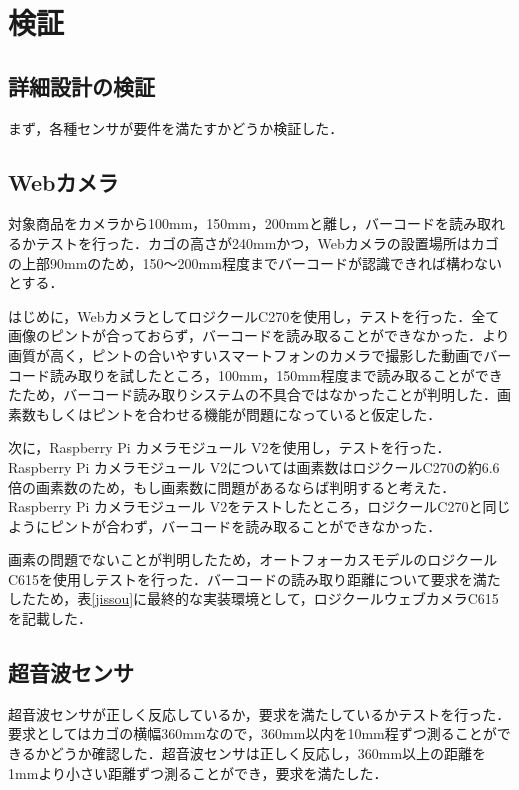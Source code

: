 

\section{検証}


\subsection{詳細設計の検証}

まず，各種センサが要件を満たすかどうか検証した．

\subsection*{Webカメラ}

対象商品をカメラから100mm，150mm，200mmと離し，バーコードを読み取れるかテストを行った．カゴの高さが240mmかつ，Webカメラの設置場所はカゴの上部90mmのため，150～200mm程度までバーコードが認識できれば構わないとする．

はじめに，WebカメラとしてロジクールC270を使用し，テストを行った．全て画像のピントが合っておらず，バーコードを読み取ることができなかった．より画質が高く，ピントの合いやすいスマートフォンのカメラで撮影した動画でバーコード読み取りを試したところ，100mm，150mm程度まで読み取ることができたため，バーコード読み取りシステムの不具合ではなかったことが判明した．画素数もしくはピントを合わせる機能が問題になっていると仮定した．

次に，Raspberry Pi カメラモジュール V2を使用し，テストを行った．Raspberry Pi カメラモジュール V2については画素数はロジクールC270の約6.6倍の画素数のため，もし画素数に問題があるならば判明すると考えた．Raspberry Pi カメラモジュール V2をテストしたところ，ロジクールC270と同じようにピントが合わず，バーコードを読み取ることができなかった．

画素の問題でないことが判明したため，オートフォーカスモデルのロジクールC615を使用しテストを行った．バーコードの読み取り距離について要求を満たしたため，表\ref{jissou}に最終的な実装環境として，ロジクールウェブカメラC615を記載した．

\subsection*{超音波センサ}

超音波センサが正しく反応しているか，要求を満たしているかテストを行った．要求としてはカゴの横幅360mmなので，360mm以内を10mm程ずつ測ることができるかどうか確認した．超音波センサは正しく反応し，360mm以上の距離を1mmより小さい距離ずつ測ることができ，要求を満たした．

